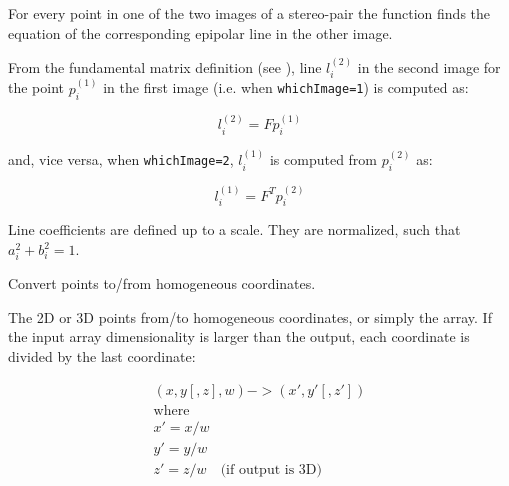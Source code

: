 For every point in one of the two images of a stereo-pair the function finds the equation of the
corresponding epipolar line in the other image.

From the fundamental matrix definition (see ),
line $l^{(2)}_i$ in the second image for the point $p^{(1)}_i$ in the first image (i.e. when \texttt{whichImage=1}) is computed as:

\[ l^{(2)}_i = F p^{(1)}_i \]

and, vice versa, when \texttt{whichImage=2}, $l^{(1)}_i$ is computed from $p^{(2)}_i$ as:

\[ l^{(1)}_i = F^T p^{(2)}_i \]

Line coefficients are defined up to a scale. They are normalized, such that $a_i^2+b_i^2=1$.

\ifCPy
{}
\else
{}
\fi
Convert points to/from homogeneous coordinates.




\begin{description}
\ifC
{}
\else
{}
\fi
\end{description}

The  2D or 3D points from/to homogeneous coordinates, or simply  the array. If the input array dimensionality is larger than the output, each coordinate is divided by the last coordinate:

\[
\begin{array}{l}
(x,y[,z],w) -> (x',y'[,z'])\\
\text{where} \\
x' = x/w \\
y' = y/w \\
z' = z/w \quad \text{(if output is 3D)}
\end{array}
\]

